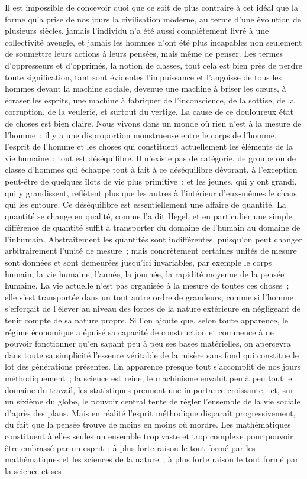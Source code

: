 \documentclass[french,twoside]{book} %
\begin{document}
\noindent \par
Il est impossible de concevoir quoi que ce soit de plus contraire à cet idéal que la forme qu'a prise de nos jours la civilisation moderne, au terme d'une évolution de plusieurs siècles. jamais l'individu n'a été aussi complètement livré à une collectivité aveugle, et jamais les hommes n'ont été plus incapables non seulement de soumettre leurs actions à leurs pensées, mais même de penser. Les termes d'oppresseurs et d'opprimés, la notion de classes, tout cela est bien près de perdre toute signification, tant sont évidentes l'impuissance et l'angoisse de tous les hommes devant la machine sociale, devenue une machine à briser les cœurs, à écraser les esprits, une machine à fabriquer de l'inconscience, de la sottise, de la corruption, de la veulerie, et surtout du vertige. La cause de ce douloureux état de choses est bien claire. Nous vivons dans un monde où rien n'est à la mesure de l'homme ; il y a une disproportion monstrueuse entre le corps de l'homme, l'esprit de l'homme et les choses qui constituent actuellement les éléments de la vie humaine ; tout est déséquilibre. Il n'existe pas de catégorie, de groupe ou de classe d'hommes qui échappe tout à fait à ce déséquilibre dévorant, à l'exception peut-être de quelques îlots de vie plus primitive ; et les jeunes, qui y ont grandi, qui y grandissent, reflètent plus que les autres à l'intérieur d'eux-mêmes le chaos qui les entoure. Ce déséquilibre est essentiellement une affaire de quantité. La quantité se change en qualité, comme l'a dit Hegel, et en particulier une simple différence de quantité suffit à transporter du domaine de l'humain au domaine de l'inhumain. Abstraitement les quantités sont indifférentes, puisqu'on peut changer arbitrairement l'unité de mesure ; mais concrètement certaines unités de mesure sont données et sont demeurées jusqu'ici invariables, par exemple le corps humain, la vie humaine, l'année, la journée, la rapidité moyenne de la pensée humaine. La vie actuelle n'est pas organisée à la mesure de toutes ces choses ; elle s'est transportée dans un tout autre ordre de grandeurs, comme si l'homme s'efforçait de l'élever au niveau des forces de la nature extérieure en négligeant de tenir compte de sa nature propre. Si l'on ajoute que, selon toute apparence, le régime économique a épuisé sa capacité de construction et commence à ne pouvoir fonctionner qu'en sapant peu à peu ses bases matérielles, on apercevra dans toute sa simplicité l'essence véritable de la misère sans fond qui constitue le lot des générations présentes. En apparence presque tout s'accomplit de nos jours méthodiquement ; la science est reine, le machinisme envahit peu à peu tout le domaine du travail, les statistiques prennent une importance croissante, -et, sur un sixième du globe, le pouvoir central tente de régler l'ensemble de la vie sociale d'après des plans. Mais en réalité l'esprit méthodique disparaît progressivement, du fait que la pensée trouve de moins en moins où mordre. Les mathématiques constituent à elles seules un ensemble trop vaste et trop complexe pour pouvoir être embrassé par un esprit ; à plus forte raison le tout formé par les mathématiques et les sciences de la nature ; à plus forte raison le tout formé par la science et ses 
\end{document}
